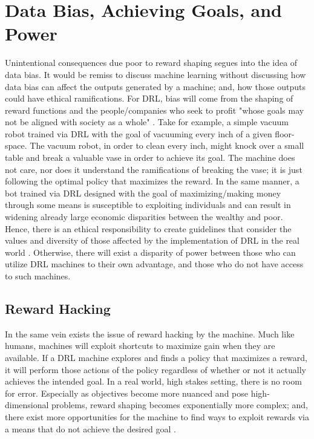 \documentclass[10pt,twocolumn]{article}
\begin{document}
\section{Data Bias, Achieving Goals, and Power}
Unintentional consequences due poor to reward shaping segues into the idea of data bias. It would be remiss to discuss machine learning without discussing how data bias can affect the outputs generated by a machine; and, how those outputs could have ethical ramifications. For DRL, bias will come from the shaping of reward functions and the people/companies who seek to profit "whose goals may not be aligned with society as a whole" \cite{10.1613/jair.1.12360}. Take for example, a simple vacuum robot trained via DRL with the goal of vacuuming every inch of a given floor-space. The vacuum robot, in order to clean every inch, might knock over a small table and break a valuable vase in order to achieve its goal. The machine does not care, nor does it understand the ramifications of breaking the vase; it is just following the optimal policy that maximizes the reward. In the same manner, a bot trained via DRL designed with the goal of maximizing/making money through some means is susceptible to exploiting individuals and can result in widening already large economic disparities between the wealthy and poor. Hence, there is an ethical responsibility to create guidelines that consider the values and diversity of those affected by the implementation of DRL in the real world \cite{10.1613/jair.1.12360}. Otherwise, there will exist a disparity of power between those who can utilize DRL machines to their own advantage, and those who do not have access to such machines. 

\subsection{Reward Hacking}
In the same vein exists the issue of reward hacking by the machine. Much like humans, machines will exploit shortcuts to maximize gain when they are available. If a DRL machine explores and finds a policy that maximizes a reward, it will perform those actions of the policy regardless of whether or not it actually achieves the intended goal. In a real world, high stakes setting, there is no room for error. Especially as objectives become more nuanced and pose high-dimensional problems, reward shaping becomes exponentially more complex; and, there exist more opportunities for the machine to find ways to exploit rewards via a means that do not achieve the desired goal \cite{frye_2021}.
\end{document}
